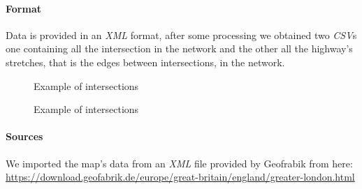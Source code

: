\paragraph{Format}
Data is provided in an \textit{XML} format, after some processing we obtained
two \textit{CSV}s one containing all the intersection in the network and the
other all the highway's stretches, that is the edges between intersections, in
the network.

\begin{figure}[H]
	
	\caption{Example of intersections}
\end{figure}

\begin{figure}[H]
	
	\caption{Example of intersections}
\end{figure}

\paragraph{Sources}
We imported the map's data from an \textit{XML} file provided by Geofrabik from
here:
\url{https://download.geofabrik.de/europe/great-britain/england/greater-london.html}

